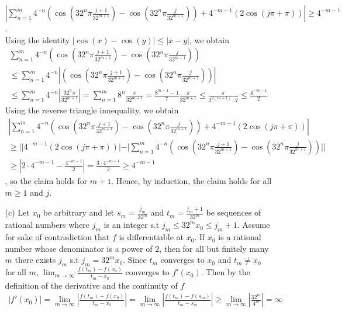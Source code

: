 \documentclass[10pt]{article}
\begin{document}
\begin{enumerate}[label=Problem \arabic*.]
\begin{itemize}
        $\displaystyle|\sum_{n=1}^{m}4^{-n}(\cos(32^n\pi \frac{j+1}{32^{m+1}})-\cos(32^n\pi \frac{j}{32^{m+1}}))+4^{-m-1}(2\cos(j\pi+\pi))|\ge4^{-m-1}$.\\
        Using the identity $|\cos(x)-\cos(y)|\le|x-y|$, we obtain
        \begin{align*}
            \sum_{n=1}^{m}4^{-n}(\cos(32^n\pi \frac{j+1}{32^{m+1}})-\cos(32^n\pi \frac{j}{32^{m+1}}))\\
            \le\sum_{n=1}^{m}4^{-n}|(\cos(32^n\pi \frac{j+1}{32^{m+1}})-\cos(32^n\pi \frac{j}{32^{m+1}}))|\\
            \le\sum_{n=1}^{m}4^{-n}|\frac{32^n\pi}{32^{m+1}}|
            =\sum_{n=1}^{m}8^n\frac{\pi}{32^{m+1}}
            =\frac{8^{m+1}-1}{7}\frac{\pi}{32^{m+1}}
            \le\frac{\pi}{2^{2(m+1)}\cdot7}
            \le\frac{4^{-m-1}}{2}
        \end{align*}
        Using the reverse triangle innequality, we obtain
        \begin{align*}
            |\sum_{n=1}^{m}4^{-n}(\cos(32^n\pi \frac{j+1}{32^{m+1}})-\cos(32^n\pi \frac{j}{32^{m+1}}))+4^{-m-1}(2\cos(j\pi+\pi))|\\
            \ge||4^{-m-1}(2\cos(j\pi+\pi))|-|\sum_{n=1}^{m}4^{-n}(\cos(32^n\pi \frac{j+1}{32^{m+1}})-\cos(32^n\pi \frac{j}{32^{m+1}}))||\\
            \ge|2\cdot4^{-m-1}-\frac{4^{-m-1}}{2}|=\frac{3\cdot4^{-m-1}}{2}\ge4^{-m-1} 
        \end{align*}
        , so the claim holds for $m+1$. Hence, by induction, the claim holds for all $m\ge1$ and $j$.
        \item [(c)] Let $x_0$ be arbitrary and let $s_m=\frac{j_m}{32^m}$ and $t_m=\frac{j_m+1}{32^m}$ be sequences of rational numbers where $j_m$ is an integer s.t $j_m\le 32^mx_0\le j_m+1$.
        Assume for sake of contradiction that $f$ is differentiable at $x_0$. 
        If $x_0$ is a rational number whose denominator is a power of $2$, then for all but finitely many $m$ there exists $j_m$ s.t $j_m=32^mx_0$.
        Since $t_m$ converges to $x_0$ and $t_m\neq x_0$ for all $m$, $\displaystyle\lim_{m\rightarrow\infty}\frac{f(t_m)-f(x_0)}{t_m-x_0}$ converges to $f'(x_0)$.
        Then by the definition of the derivative and the continuity of $f$
        \begin{align*}
        |f'(x_0)|=\lim_{m\rightarrow\infty}|\frac{f(t_m)-f(x_0)}{t_m-x_0}|=\lim_{m\rightarrow\infty}|\frac{f(t_m)-f(s_m)}{t_m-s_m}|\ge\lim_{m\rightarrow\infty}|\frac{32^m}{4^m}|=\infty
        \end{align*}

\end{itemize}
\end{enumerate}
\end{document}

